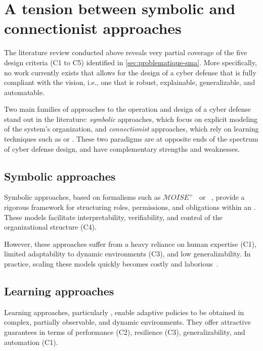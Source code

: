 \section{A tension between symbolic and connectionist approaches}\label{sec:limits-existing}

The literature review conducted above reveals very partial coverage of the five design criteria (C1 to C5) identified in \autoref{sec:problematique-sma}. More specifically, no work currently exists that allows for the design of a cyber defense  that is fully compliant with the  vision, i.e., one that is robust, explainable, generalizable, and automatable.

Two main families of approaches to the operation and design of a cyber defense  stand out in the literature: \textit{symbolic} approaches, which focus on explicit modeling of the system's organization, and \textit{connectionist} approaches, which rely on learning techniques such as  or . These two paradigms are at opposite ends of the spectrum of  cyber defense design, and have complementary strengths and weaknesses.

\subsection{Symbolic approaches}

Symbolic approaches, based on formalisms such as $\mathcal{M}OISE^+$~\cite{hubner2002moise} or ~\cite{Ferber2004}, provide a rigorous framework for structuring roles, permissions, and obligations within an . These models facilitate interpretability, verifiability, and control of the organizational structure (C4).

However, these approaches suffer from a heavy reliance on human expertise (C1), limited adaptability to dynamic environments (C3), and low generalizability. In practice, scaling these models quickly becomes costly and laborious~\cite{Picard2006}.

\subsection{Learning approaches}

Learning approaches, particularly , enable adaptive policies to be obtained in complex, partially observable, and dynamic environments. They offer attractive guarantees in terms of performance (C2), resilience (C3), generalizability, and automation (C1).

